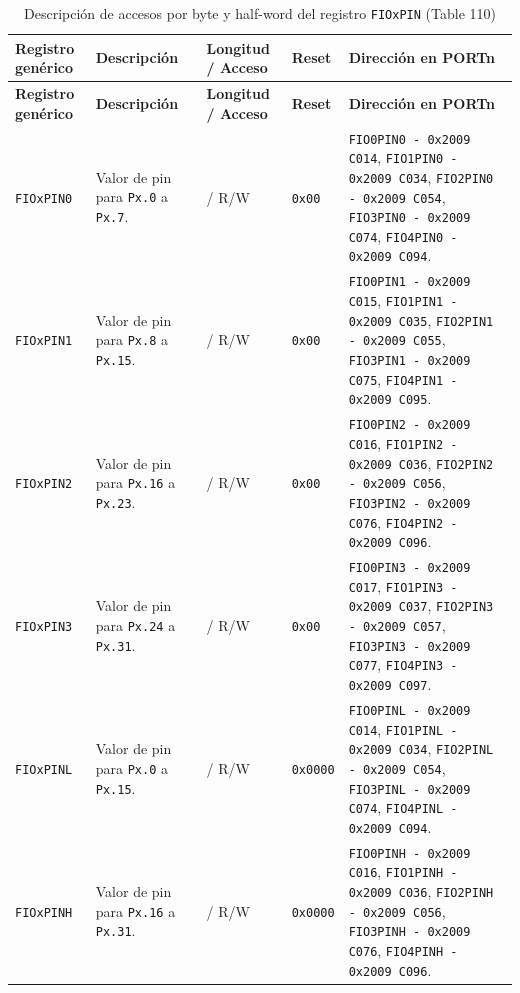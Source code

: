 \begin{longtable}{|>{\raggedright\arraybackslash}p{}|>{\raggedright\arraybackslash}p{}|>{\centering\arraybackslash}p{}|>{\centering\arraybackslash}p{}|>{\raggedright\arraybackslash}p{}|}
\caption{Descripción de accesos por byte y half-word del registro \texttt{FIOxPIN} (Table 110)} \\
\hline
\textbf{Registro genérico} & \textbf{Descripción} & \textbf{Longitud / Acceso} & \textbf{Reset} & \textbf{Dirección en PORTn} \\
\hline
\endfirsthead
\hline
\textbf{Registro genérico} & \textbf{Descripción} & \textbf{Longitud / Acceso} & \textbf{Reset} & \textbf{Dirección en PORTn} \\
\hline
\endhead
\texttt{FIOxPIN0} & Valor de pin para \texttt{Px.0} a \texttt{Px.7}. & 8 / R/W & \texttt{0x00} & \texttt{FIO0PIN0 - 0x2009 C014}, \texttt{FIO1PIN0 - 0x2009 C034}, \texttt{FIO2PIN0 - 0x2009 C054}, \texttt{FIO3PIN0 - 0x2009 C074}, \texttt{FIO4PIN0 - 0x2009 C094}. \\
\hline
\texttt{FIOxPIN1} & Valor de pin para \texttt{Px.8} a \texttt{Px.15}. & 8 / R/W & \texttt{0x00} & \texttt{FIO0PIN1 - 0x2009 C015}, \texttt{FIO1PIN1 - 0x2009 C035}, \texttt{FIO2PIN1 - 0x2009 C055}, \texttt{FIO3PIN1 - 0x2009 C075}, \texttt{FIO4PIN1 - 0x2009 C095}. \\
\hline
\texttt{FIOxPIN2} & Valor de pin para \texttt{Px.16} a \texttt{Px.23}. & 8 / R/W & \texttt{0x00} & \texttt{FIO0PIN2 - 0x2009 C016}, \texttt{FIO1PIN2 - 0x2009 C036}, \texttt{FIO2PIN2 - 0x2009 C056}, \texttt{FIO3PIN2 - 0x2009 C076}, \texttt{FIO4PIN2 - 0x2009 C096}. \\
\hline
\texttt{FIOxPIN3} & Valor de pin para \texttt{Px.24} a \texttt{Px.31}. & 8 / R/W & \texttt{0x00} & \texttt{FIO0PIN3 - 0x2009 C017}, \texttt{FIO1PIN3 - 0x2009 C037}, \texttt{FIO2PIN3 - 0x2009 C057}, \texttt{FIO3PIN3 - 0x2009 C077}, \texttt{FIO4PIN3 - 0x2009 C097}. \\
\hline
\texttt{FIOxPINL} & Valor de pin para \texttt{Px.0} a \texttt{Px.15}. & 16 / R/W & \texttt{0x0000} & \texttt{FIO0PINL - 0x2009 C014}, \texttt{FIO1PINL - 0x2009 C034}, \texttt{FIO2PINL - 0x2009 C054}, \texttt{FIO3PINL - 0x2009 C074}, \texttt{FIO4PINL - 0x2009 C094}. \\
\hline
\texttt{FIOxPINH} & Valor de pin para \texttt{Px.16} a \texttt{Px.31}. & 16 / R/W & \texttt{0x0000} & \texttt{FIO0PINH - 0x2009 C016}, \texttt{FIO1PINH - 0x2009 C036}, \texttt{FIO2PINH - 0x2009 C056}, \texttt{FIO3PINH - 0x2009 C076}, \texttt{FIO4PINH - 0x2009 C096}. \\
\hline
\end{longtable}


